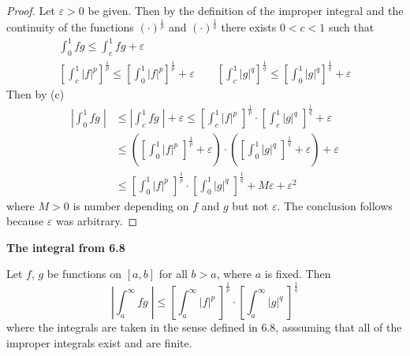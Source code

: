 \documentclass{homework}
\begin{document}
\begin{alphaparts}
		\begin{proof}
			Let $\varepsilon > 0$ be given. Then by the definition of the improper integral and the continuity of the functions $(\cdot)^\frac{1}{p}$ and $(\cdot)^\frac{1}{q}$ there exists $0 < c < 1$ such that
			$$
			\begin{gathered}
				\int_0^1fg \le \int_c^1fg + \varepsilon\\ \left[\int_c^1|f|^p\right]^\frac{1}{p}\le \left[\int_0^1|f|^p\right]^\frac{1}{p} + \varepsilon \qquad \left[\int_c^1|g|^q\right]^\frac{1}{q} \le \left[\int_0^1|g|^q\right]^\frac{1}{q} + \varepsilon
			\end{gathered}
			$$
			Then by (c)
			$$
			\begin{aligned}
				\left|\int_0^1fg\;\right| &\le \left|\int_c^1 fg\;\right| + \varepsilon \le \left[\int_c^1|f|^p\;\right]^\frac{1}{p}\cdot\left[\int_c^1 |g|^q\;\right]^\frac{1}{q} + \varepsilon\\
				&\le \left(\left[\int_0^1|f|^p\;\right]^\frac{1}{p}+\varepsilon\right)\cdot\left(\left[\int_0^1 |g|^q\;\right]^\frac{1}{q}+\varepsilon\right) + \varepsilon\\
				&\le \left[\int_0^1|f|^p\;\right]^\frac{1}{p}\cdot\left[\int_0^1 |g|^q\;\right]^\frac{1}{q} + M\varepsilon + \varepsilon^2
			\end{aligned}
			$$
			where $M > 0$ is number depending on $f$ and $g$ but not $\varepsilon$. The conclusion follows because $\varepsilon$ was arbitrary.
		\end{proof}
		
		\textbf{The integral from 6.8}
		
		Let $f$, $g$ be functions on $[a,b]$ for all $b > a$, where $a$ is fixed. Then
		$$
		\left| \int_a^\infty fg \;\right|\le \left[\int_a^\infty|f|^p\;\right]^\frac{1}{p}\cdot\left[\int_a^\infty|g|^q\;\right]^\frac{1}{q}
		$$
		where the integrals are taken in the sense defined in 6.8, asssuming that all of the improper integrals exist and are finite.
		

\end{alphaparts}
\end{document}
